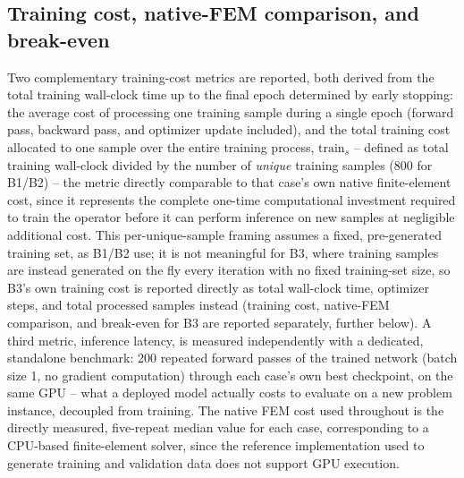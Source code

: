 \documentclass[final,5p,times]{elsarticle}
\begin{document}
\subsection{Training cost, native-FEM comparison, and break-even}
Two complementary training-cost metrics are reported, both derived from
the total training wall-clock time up to the final epoch determined by
early stopping: the average cost of processing one training sample during
a single epoch (forward pass, backward pass, and optimizer update
included), and the total training cost allocated to one sample over the
entire training process, $\text{train}_s$ -- defined as total training
wall-clock divided by the number of \emph{unique} training samples (800
for B1/B2) -- the metric directly comparable to that case's own native
finite-element cost, since it represents the complete one-time
computational investment required to train the operator before it can
perform inference on new samples at negligible additional cost. This
per-unique-sample framing assumes a fixed, pre-generated training set, as
B1/B2 use; it is not meaningful for B3, where training samples are
instead generated on the fly every iteration with no fixed training-set
size, so B3's own training cost is reported directly as total wall-clock
time, optimizer steps, and total processed samples instead (training
cost, native-FEM comparison, and break-even for B3 are reported
separately, further below). A third metric, inference latency, is measured
independently with a dedicated, standalone benchmark: 200 repeated forward
passes of the trained network (batch size 1, no gradient computation)
through each case's own best checkpoint, on the same GPU -- what a
deployed model actually costs to evaluate on a new problem instance,
decoupled from training. The native FEM cost used throughout is the
directly measured, five-repeat median value for each case, corresponding
to a CPU-based finite-element solver, since the reference implementation
used to generate training and validation data does not support GPU
execution.
\end{document}
